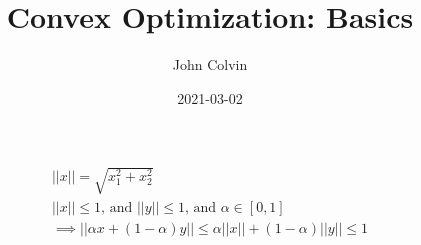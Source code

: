 \documentclass{article}
\title{Convex Optimization: Basics}
\date{2021-03-02}
\author{John Colvin}
\begin{document}
\maketitle
\begin{headered_note}
  \begin{align*}
    ||x||=\sqrt{x_1^2+x_2^2}\\
    ||x||\leq 1\text{, and }||y||\leq 1\text{, and }\alpha \in [0,1]\\
    \implies ||\alpha x+(1-\alpha)y||\leq \alpha ||x||+(1-\alpha)||y||\leq 1
  \end{align*}
\end{headered_note}
\end{document}
